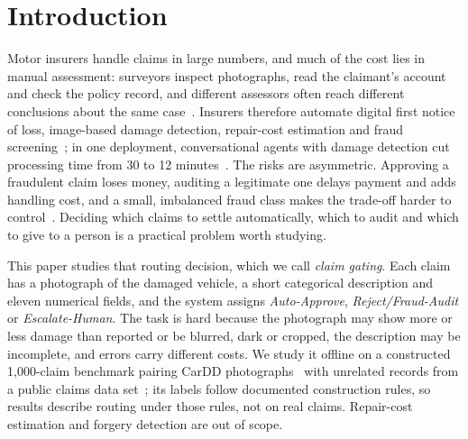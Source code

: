 \section{Introduction}\label{sec:intro}

Motor insurers handle claims in large numbers, and much of the cost lies in manual assessment: surveyors inspect photographs, read the claimant's account and check the policy record, and different assessors often reach different conclusions about the same case~\cite{ouf2026,cheng2026}. Insurers therefore automate digital first notice of loss, image-based damage detection, repair-cost estimation and fraud screening~\cite{arconzo2026,subhash2026,ouf2026}; in one deployment, conversational agents with damage detection cut processing time from 30 to 12 minutes~\cite{arconzo2026}. The risks are asymmetric. Approving a fraudulent claim loses money, auditing a legitimate one delays payment and adds handling cost, and a small, imbalanced fraud class makes the trade-off harder to control~\cite{bekkaye2026}. Deciding which claims to settle automatically, which to audit and which to give to a person is a practical problem worth studying.

This paper studies that routing decision, which we call \emph{claim gating}. Each claim has a photograph of the damaged vehicle, a short categorical description and eleven numerical fields, and the system assigns \emph{Auto-Approve}, \emph{Reject/Fraud-Audit} or \emph{Escalate-Human}. The task is hard because the photograph may show more or less damage than reported or be blurred, dark or cropped, the description may be incomplete, and errors carry different costs. We study it offline on a constructed 1,000-claim benchmark pairing CarDD photographs~\cite{wang2023cardd} with unrelated records from a public claims data set~\cite{kaggleclaims}; its labels follow documented construction rules, so results describe routing under those rules, not on real claims. Repair-cost estimation and forgery detection are out of scope.

